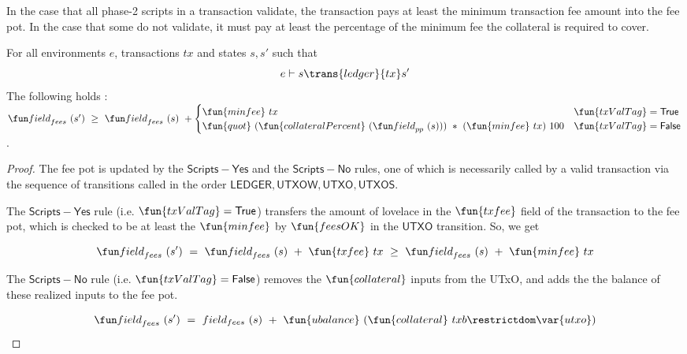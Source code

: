 \begin{property}
  \label{prop:pay-fees}

In the case that all phase-2 scripts in a transaction validate, the transaction pays
at least the minimum transaction fee amount into the fee pot. In the case that
some do not validate, it must pay at least the percentage of the minimum fee
the collateral is required to cover.

\begin{lemma}
  For all environments $e$, transactions $tx$ and states $s, s'$ such that
  \begin{equation*}
    e\vdash s\trans{ledger}{tx}s'
  \end{equation*}
  The following holds : \\
  $\field_{fees}~(s')~\geq~\field_{fees}~(s)~+
  \begin{cases}
    \fun{minfee}~{tx} & \fun{txValTag} = \True \\
    \fun{quot}~(\fun{collateralPercent}~(\field_{pp}~(s)))~*~(\fun{minfee}~{tx})~100 & \fun{txValTag} = \False\\
  \end{cases}$.
\end{lemma}
\begin{proof}
  The fee pot is updated by the $\mathsf{Scripts{-}Yes}$ and the $\mathsf{Scripts{-}No}$
  rules, one of which is necessarily called by a valid transaction via the sequence
  of transitions called in the order $\mathsf{LEDGER}, \mathsf{UTXOW}, \mathsf{UTXO}, \mathsf{UTXOS}$.

  The $\mathsf{Scripts{-}Yes}$ rule (i.e. $\fun{txValTag} = \True$)
  transfers the amount of lovelace in the $\fun{txfee}$ field of the
  transaction to the fee pot, which is checked to be at least the $\fun{minfee}$
  by $\fun{feesOK}$ in the $\mathsf{UTXO}$ transition. So, we get

  \[\field_{fees}~(s')~=~\field_{fees}~(s)~+~\fun{txfee}~{tx}~\geq~\field_{fees}~(s)~+~\fun{minfee}~{tx}\]

  The $\mathsf{Scripts{-}No}$ rule (i.e. $\fun{txValTag} = \False$) removes the
  $\fun{collateral}$ inputs from the
  UTxO, and adds the the balance of these realized inputs to the fee pot.

  \[\field_{fees}~(s')~=~field_{fees}~(s)~+~\fun{ubalance}~(\fun{collateral}~{txb} \restrictdom \var{utxo})\]


\end{proof}
\end{property}
